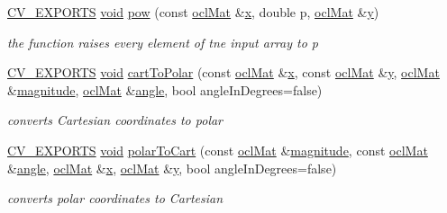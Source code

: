 \begin{DoxyCompactItemize}
\hyperlink{core_2types__c_8h_a1bf9f0e121b54272da02379cfccd0a2b}{C\-V\-\_\-\-E\-X\-P\-O\-R\-T\-S} \hyperlink{legacy_8hpp_a8bb47f092d473522721002c86c13b94e}{void} \hyperlink{namespacecv_1_1ocl_a828b03bad48224ea0a2f03e1d25ffcf4}{pow} (const \hyperlink{classcv_1_1ocl_1_1oclMat}{ocl\-Mat} \&\hyperlink{highgui__c_8h_a6150e0515f7202e2fb518f7206ed97dc}{x}, double p, \hyperlink{classcv_1_1ocl_1_1oclMat}{ocl\-Mat} \&\hyperlink{highgui__c_8h_af1202c02b14870c18fb3a1da73e9e7c7}{y})
\begin{DoxyCompactList}\small\item\em the function raises every element of tne input array to p \end{DoxyCompactList}\item 
\hyperlink{core_2types__c_8h_a1bf9f0e121b54272da02379cfccd0a2b}{C\-V\-\_\-\-E\-X\-P\-O\-R\-T\-S} \hyperlink{legacy_8hpp_a8bb47f092d473522721002c86c13b94e}{void} \hyperlink{namespacecv_1_1ocl_adee14eb40dbbba050761af31b7f16ff7}{cart\-To\-Polar} (const \hyperlink{classcv_1_1ocl_1_1oclMat}{ocl\-Mat} \&\hyperlink{highgui__c_8h_a6150e0515f7202e2fb518f7206ed97dc}{x}, const \hyperlink{classcv_1_1ocl_1_1oclMat}{ocl\-Mat} \&\hyperlink{highgui__c_8h_af1202c02b14870c18fb3a1da73e9e7c7}{y}, \hyperlink{classcv_1_1ocl_1_1oclMat}{ocl\-Mat} \&\hyperlink{namespacecv_1_1ocl_a4145176dccaeb025289e5ede5c21756c}{magnitude}, \hyperlink{classcv_1_1ocl_1_1oclMat}{ocl\-Mat} \&\hyperlink{imgproc__c_8h_a79dea7ed146af26ff4a0ba4bf5c83eee}{angle}, bool angle\-In\-Degrees=false)
\begin{DoxyCompactList}\small\item\em converts Cartesian coordinates to polar \end{DoxyCompactList}\item 
\hyperlink{core_2types__c_8h_a1bf9f0e121b54272da02379cfccd0a2b}{C\-V\-\_\-\-E\-X\-P\-O\-R\-T\-S} \hyperlink{legacy_8hpp_a8bb47f092d473522721002c86c13b94e}{void} \hyperlink{namespacecv_1_1ocl_a8881bdbddc23c05001c00dcca9c93404}{polar\-To\-Cart} (const \hyperlink{classcv_1_1ocl_1_1oclMat}{ocl\-Mat} \&\hyperlink{namespacecv_1_1ocl_a4145176dccaeb025289e5ede5c21756c}{magnitude}, const \hyperlink{classcv_1_1ocl_1_1oclMat}{ocl\-Mat} \&\hyperlink{imgproc__c_8h_a79dea7ed146af26ff4a0ba4bf5c83eee}{angle}, \hyperlink{classcv_1_1ocl_1_1oclMat}{ocl\-Mat} \&\hyperlink{highgui__c_8h_a6150e0515f7202e2fb518f7206ed97dc}{x}, \hyperlink{classcv_1_1ocl_1_1oclMat}{ocl\-Mat} \&\hyperlink{highgui__c_8h_af1202c02b14870c18fb3a1da73e9e7c7}{y}, bool angle\-In\-Degrees=false)
\begin{DoxyCompactList}\small\item\em converts polar coordinates to Cartesian \end{DoxyCompactList}\item 

\end{DoxyCompactItemize}
